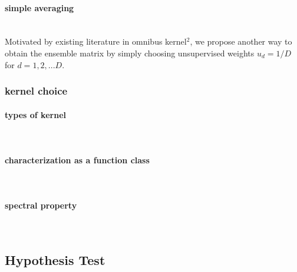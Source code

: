 \documentclass[11pt]{article}
\begin{document}
\paragraph{simple averaging}\mbox{}\\
Motivated by existing literature in omnibus kernel$^{2}$, we propose another way to obtain the ensemble matrix by simply choosing unsupervised weights $u_d=1/D$ for $d=1,2,...D$.

\subsubsection{{kernel choice}}
\paragraph{types of kernel}\mbox{}\\
\paragraph{characterization as a function class}\mbox{}\\
\paragraph{spectral property}\mbox{}\\

\subsection{{\textbf{Hypothesis Test}}}
\setcounter{equation}{0}
\renewcommand{\theequation}{2.2.\arabic{equation}}
\end{document}
